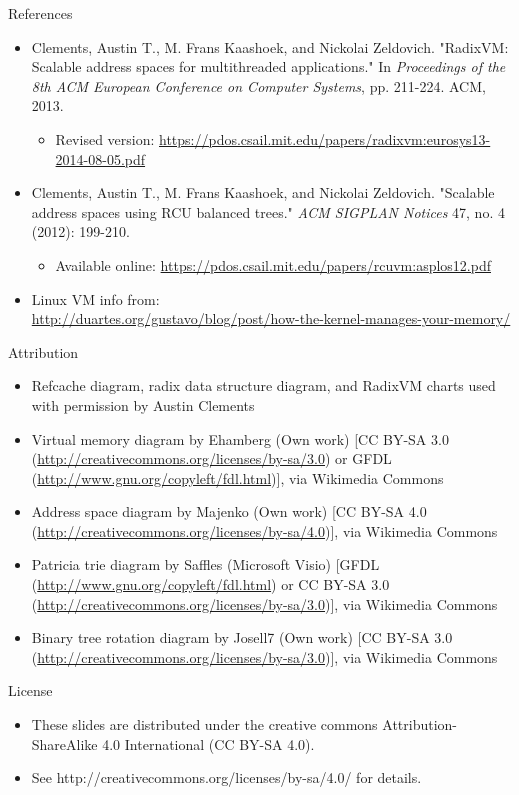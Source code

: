 \documentclass[aspectratio=169]{beamer}
\newcommand{\bi}{\begin{itemize}}
\newcommand{\ei}{\end{itemize}}
\begin{document}

\begin{frame}[noframenumbering]{References}
  \bi
\item Clements, Austin T., M. Frans Kaashoek, and Nickolai Zeldovich. "RadixVM: Scalable address spaces for multithreaded applications." In \emph{Proceedings of the 8th ACM European Conference on Computer Systems}, pp. 211-224. ACM, 2013.
  \bi
\item Revised version: \url{https://pdos.csail.mit.edu/papers/radixvm:eurosys13-2014-08-05.pdf}
  \ei
\item Clements, Austin T., M. Frans Kaashoek, and Nickolai Zeldovich. "Scalable address spaces using RCU balanced trees." \emph{ACM SIGPLAN Notices} 47, no. 4 (2012): 199-210.
  \bi
\item Available online: \url{https://pdos.csail.mit.edu/papers/rcuvm:asplos12.pdf}
  \ei
\item Linux VM info from:\\ \url{http://duartes.org/gustavo/blog/post/how-the-kernel-manages-your-memory/}
  \ei
\end{frame}

\begin{frame}[noframenumbering]{Attribution}
  \bi
\item Refcache diagram, radix data structure diagram, and RadixVM charts used with permission by Austin Clements
\item Virtual memory diagram by Ehamberg (Own work) [CC BY-SA 3.0 (\url{http://creativecommons.org/licenses/by-sa/3.0}) or GFDL (\url{http://www.gnu.org/copyleft/fdl.html})], via Wikimedia Commons
\item Address space diagram by Majenko (Own work) [CC BY-SA 4.0 (\url{http://creativecommons.org/licenses/by-sa/4.0})], via Wikimedia Commons
\item Patricia trie diagram by Saffles (Microsoft Visio) [GFDL (\url{http://www.gnu.org/copyleft/fdl.html}) or CC BY-SA 3.0 (\url{http://creativecommons.org/licenses/by-sa/3.0})], via Wikimedia Commons
  \item Binary tree rotation diagram by Josell7 (Own work) [CC BY-SA 3.0 (\url{http://creativecommons.org/licenses/by-sa/3.0})], via Wikimedia Commons
  \ei
\end{frame}

\begin{frame}[noframenumbering]{License}
  \bi
\item These slides are distributed under the creative commons
  Attribution-ShareAlike 4.0 International (CC BY-SA 4.0).
\item See http://creativecommons.org/licenses/by-sa/4.0/ for details.
  \ei
\end{frame}
\end{document}
